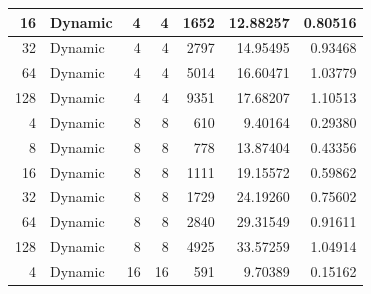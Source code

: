 \documentclass[journal,transmag]{IEEEtran}
\begin{document}
\begin{table}[h]
\begin{tabular}{|r|l|r|r|r|r|r|}
		16                            & Dynamic  & 4                          & 4                          & 1652                           & 12.88257                      & 0.80516                         \\ \hline
		32                            & Dynamic  & 4                          & 4                          & 2797                           & 14.95495                      & 0.93468                         \\ \hline
		64                            & Dynamic  & 4                          & 4                          & 5014                           & 16.60471                      & 1.03779                         \\ \hline
		128                           & Dynamic  & 4                          & 4                          & 9351                           & 17.68207                      & 1.10513                         \\ \hline
		4                             & Dynamic  & 8                          & 8                          & 610                            & 9.40164                       & 0.29380                         \\ \hline
		8                             & Dynamic  & 8                          & 8                          & 778                            & 13.87404                      & 0.43356                         \\ \hline
		16                            & Dynamic  & 8                          & 8                          & 1111                           & 19.15572                      & 0.59862                         \\ \hline
		32                            & Dynamic  & 8                          & 8                          & 1729                           & 24.19260                      & 0.75602                         \\ \hline
		64                            & Dynamic  & 8                          & 8                          & 2840                           & 29.31549                      & 0.91611                         \\ \hline
		128                           & Dynamic  & 8                          & 8                          & 4925                           & 33.57259                      & 1.04914                         \\ \hline
		4                             & Dynamic  & 16                         & 16                         & 591                            & 9.70389                       & 0.15162                         \\ \hline

\end{tabular}
\end{table}
\end{document}
